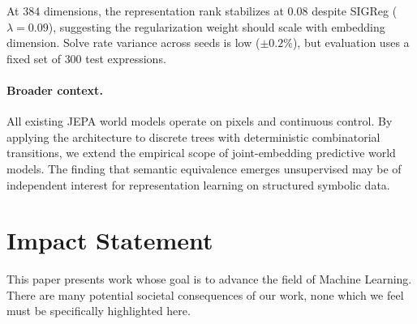 \documentclass{article}
\begin{document}
At $384$ dimensions, the representation rank stabilizes at $0.08$ despite
SIGReg ($\lambda = 0.09$), suggesting the regularization weight should
scale with embedding dimension. Solve rate variance across seeds is low
($\pm 0.2\%$), but evaluation uses a fixed set of $300$ test expressions.

\paragraph{Broader context.}
All existing JEPA world models operate on pixels and continuous control. By
applying the architecture to discrete trees with deterministic combinatorial
transitions, we extend the empirical scope of joint-embedding predictive
world models. The finding that semantic equivalence emerges unsupervised may
be of independent interest for representation learning on structured
symbolic data.

\section*{Impact Statement}

This paper presents work whose goal is to advance the field of Machine
Learning. There are many potential societal consequences of our work, none
which we feel must be specifically highlighted here.



\end{document}
